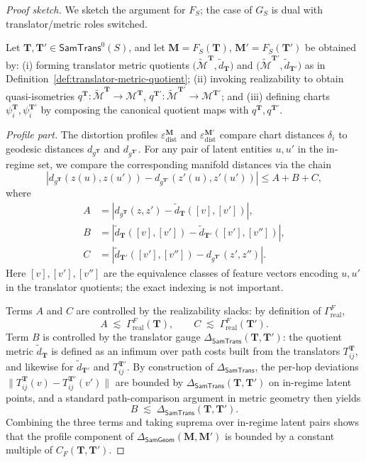 \documentclass[11pt]{article}
\newcommand{\SamTrans}{\mathsf{SamTrans}}
\newcommand{\SamGeom}{\mathsf{SamGeom}}
\begin{document}
\begin{proof}[Proof sketch]
We sketch the argument for $F_S$; the case of $G_S$ is dual with
translator/metric roles switched.

Let $\mathbf{T},\mathbf{T}' \in \SamTrans^0(S)$, and let
$\mathbf{M}=F_S(\mathbf{T})$,
$\mathbf{M}'=F_S(\mathbf{T}')$ be obtained by:
(i) forming translator metric quotients
$\bigl(\tilde{\mathcal{M}}^{\mathbf{T}}, \tilde d_{\mathbf{T}}\bigr)$ and
$\bigl(\tilde{\mathcal{M}}^{\mathbf{T}'}, \tilde d_{\mathbf{T}'}\bigr)$
as in Definition~\ref{def:translator-metric-quotient};
(ii) invoking realizability to obtain quasi-isometries
$q^{\mathbf{T}} : \tilde{\mathcal{M}}^{\mathbf{T}} \to \mathcal{M}^{\mathbf{T}}$,
$q^{\mathbf{T}'} : \tilde{\mathcal{M}}^{\mathbf{T}'} \to \mathcal{M}^{\mathbf{T}'}$;
and (iii) defining charts $\psi_i^{\mathbf{T}},\psi_i^{\mathbf{T}'}$ by
composing the canonical quotient maps with $q^{\mathbf{T}}, q^{\mathbf{T}'}$.

\emph{Profile part.}
The distortion profiles $\varepsilon_{\mathrm{dist}}^{\mathbf{M}}$ and
$\varepsilon_{\mathrm{dist}}^{\mathbf{M}'}$ compare chart distances
$\delta_i$ to geodesic distances $d_{g^{\mathbf{T}}}$ and
$d_{g^{\mathbf{T}'}}$.
For any pair of latent entities $u,u'$ in the in-regime set, we compare
the corresponding manifold distances via the chain
\[
\left| d_{g^{\mathbf{T}}}(z(u),z(u')) -
       d_{g^{\mathbf{T}'}}(z'(u),z'(u')) \right|
\le A + B + C,
\]
where
\begin{align*}
A &= \left| d_{g^{\mathbf{T}}}(z,z') - \tilde d_{\mathbf{T}}([v],[v']) \right|,
\\
B &= \left| \tilde d_{\mathbf{T}}([v],[v']) - \tilde d_{\mathbf{T}'}([v'],[v'']) \right|,
\\
C &= \left| \tilde d_{\mathbf{T}'}([v'],[v'']) - d_{g^{\mathbf{T}'}}(z',z'') \right|.
\end{align*}
Here $[v],[v'],[v'']$ are the equivalence classes of feature vectors
encoding $u,u'$ in the translator quotients; the exact indexing is not
important.

Terms $A$ and $C$ are controlled by the realizability slacks:
by definition of $\Gamma_{\mathrm{real}}^{F}$,
\[
A \;\lesssim\; \Gamma_{\mathrm{real}}^{F}(\mathbf{T}),\qquad
C \;\lesssim\; \Gamma_{\mathrm{real}}^{F}(\mathbf{T}').
\]
Term $B$ is controlled by the translator gauge
$\Delta_{\SamTrans}(\mathbf{T},\mathbf{T}')$: the quotient metric
$\tilde d_{\mathbf{T}}$ is defined as an infimum over path costs built
from the translators $T_{ij}^{\mathbf{T}}$, and likewise for
$\tilde d_{\mathbf{T}'}$ and $T_{ij}^{\mathbf{T}'}$. By construction of
$\Delta_{\SamTrans}$, the per-hop deviations
$\|T_{ij}^{\mathbf{T}}(v) - T_{ij}^{\mathbf{T}'}(v')\|$ are bounded by
$\Delta_{\SamTrans}(\mathbf{T},\mathbf{T}')$ on in-regime latent points,
and a standard path-comparison argument in metric geometry then yields
\[
B \;\lesssim\; \Delta_{\SamTrans}(\mathbf{T},\mathbf{T}').
\]
Combining the three terms and taking suprema over in-regime latent
pairs shows that the profile component of
$\Delta_{\SamGeom}(\mathbf{M},\mathbf{M}')$ is bounded by a constant
multiple of $C_F(\mathbf{T},\mathbf{T}')$.


\end{proof}
\end{document}
